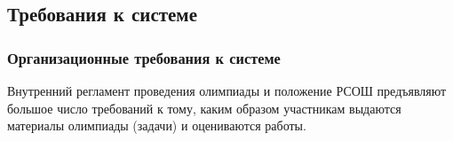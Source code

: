 

\subsection{Требования к системе}

\subsubsection{Организационные требования к системе}
\label{cha:the:board:org}

Внутренний регламент проведения олимпиады и положение РСОШ предъявляют большое число требований к тому, каким образом участникам выдаются материалы олимпиады (задачи) и оцениваются работы.


